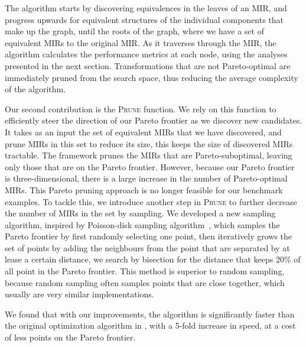 The algorithm starts by discovering equivalences in the leaves of an MIR,
and progress upwards for equivalent structures of the individual components
that make up the graph, until the roots of the graph, where we have a set of
equivalent MIRs to the original MIR\@.  As it traverses through the MIR, the
algorithm calculates the performance metrics at each node, using the analyses
presented in the next section.  Transformations that are not Pareto-optimal are
immediately pruned from the search space, thus reducing the average complexity
of the algorithm.

Our second contribution is the \textsc{Prune} function.  We rely on this
function to efficiently steer the direction of our Pareto frontier as we
discover new candidates.  It takes as an input the set of equivalent MIRs
that we have discovered, and prune MIRs in this set to reduce its size, this
keeps the size of discovered MIRs tractable.  The \SOAP{} framework prunes the
MIRs that are Pareto-suboptimal, leaving only those that are on the Pareto
frontier.  However, because our Pareto frontier is three-dimensional, there is
a large increase in the number of Pareto-optimal MIRs.  This Pareto pruning
approach is no longer feasible for our benchmark examples.  To tackle this,
we introduce another step in \textsc{Prune} to further decrease the number of
MIRs in the set by sampling.  We developed a new sampling algorithm, inspired
by Poisson-disk sampling algorithm~\cite{bridson07}, which samples the Pareto
frontier by first randomly selecting one point, then iteratively grows the set
of points by adding the neighbours from the point that are separated by at
lease a certain distance, we search by bisection for the distance that keeps
20\% of all point in the Pareto frontier.  This method is superior to random
sampling, because random sampling often samples points that are close together,
which usually are very similar implementations.

We found that with our improvements, the algorithm is significantly faster than
the original optimization algorithm in \SOAP, with a 5-fold increase in speed,
at a cost of less points on the Pareto frontier.


